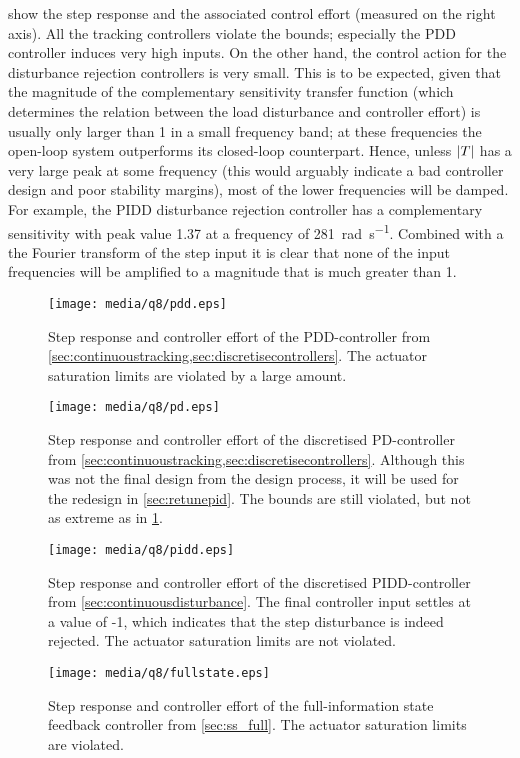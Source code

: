  show the step response and the associated control effort (measured on the right axis). All the tracking controllers violate the bounds; especially the PDD controller induces very high inputs.
On the other hand, the control action for the disturbance rejection controllers is very small. This is to be expected, given that the magnitude of the complementary sensitivity transfer function (which determines the relation between the load disturbance and controller effort) is usually only larger than 1 in a small frequency band; at these frequencies the open-loop system outperforms its closed-loop counterpart. Hence, unless $\abs{T}$ has a very large peak at some frequency (this would arguably indicate a bad controller design and poor stability margins), most of the lower frequencies will be damped. For example, the PIDD disturbance rejection controller has a complementary sensitivity with peak value 1.37 at a frequency of \SI{281}{\radian\per\second}. Combined with a the Fourier transform of the step input it is clear that none of the input frequencies will be amplified to a magnitude that is much greater than 1.
\begin{figure}[ht!]
    \centering
    \texttt{[image: media/q8/pdd.eps]}
    \caption{Step response and controller effort of the PDD-controller from \cref{sec:continuoustracking,sec:discretisecontrollers}. The actuator saturation limits are violated by a large amount.}
    \label{fig:q8_pdd}
\end{figure}
\begin{figure}[ht!]
    \centering
    \texttt{[image: media/q8/pd.eps]}
    \caption{Step response and controller effort of the discretised PD-controller from \cref{sec:continuoustracking,sec:discretisecontrollers}. Although this was not the final design from the design process, it will be used for the redesign in \cref{sec:retunepid}. The bounds are still violated, but not as extreme as in \cref{fig:q8_pdd}.}
    \label{fig:q8_pd}
\end{figure}
\begin{figure}[ht!]
    \centering
    \texttt{[image: media/q8/pidd.eps]}
    \caption{Step response and controller effort of the discretised PIDD-controller from \cref{sec:continuousdisturbance}. The final controller input settles at a value of -1, which indicates that the step disturbance is indeed rejected. The actuator saturation limits are not violated.}
    \label{fig:q8_pidd}
\end{figure}
\begin{figure}[ht!]
    \centering
    \texttt{[image: media/q8/fullstate.eps]}
    \caption{Step response and controller effort of the full-information state feedback controller from \cref{sec:ss_full}. The actuator saturation limits are violated.}
    \label{fig:q8_fullstate}
\end{figure}

